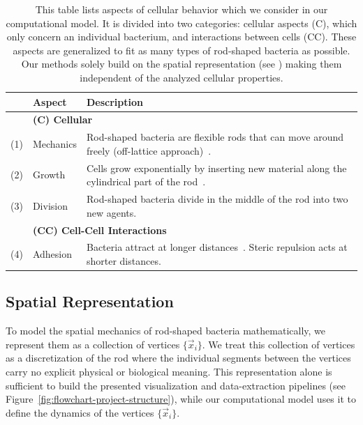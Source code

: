 \begin{table}[H]
    \centering
    \def\arraystretch{1.3}
    \begin{tabularx}{\textwidth}{c l X}
        &\textbf{Aspect} & \textbf{Description}\\
        \toprule
        &\multicolumn{2}{l}{\textbf{(C) Cellular}}\\
        \midrule
        (1) & Mechanics &
            Rod-shaped bacteria are flexible rods that can move around freely (off-lattice
            approach)~\cite{Takeuchi2005,Ursell2014,Amir2014_2}.\\
        (2) & Growth &
            Cells grow exponentially by inserting new material along the cylindrical part of the
            rod~\cite{Robert2014,Takeuchi2005}.\\
        (3) & Division &
            Rod-shaped bacteria divide in the middle of the rod into two new agents.\\
        &\multicolumn{2}{l}{\textbf{(CC) Cell-Cell Interactions}}\\
        \midrule
        (4) & Adhesion &
            Bacteria attract at longer distances~\cite{Verwey1947,Trejo2013}.
            Steric repulsion acts at shorter distances.\\
        \bottomrule
    \end{tabularx}
    \caption[Simulation Aspects of Elongated Bacteria Computational Model]{
        This table lists aspects of cellular behavior which we consider in our computational model.
        It is divided into two categories: cellular aspects (C), which only concern an individual
        bacterium, and interactions between cells (CC).
        These aspects are generalized to fit as many types of rod-shaped bacteria as possible.
        Our methods solely build on the spatial representation (see
        ) making them independent of the analyzed cellular
        properties.
    }
    \label{table:simulation-aspects}
\end{table}

\subsection{Spatial Representation}
\label{subsec:spatial-representation}
To model the spatial mechanics of rod-shaped bacteria \cite{Billaudeau2017} mathematically, we represent them as a
collection of vertices $\{\vec{x}_i\}$.
We treat this collection of vertices as a discretization of the rod where the individual segments
between the vertices carry no explicit physical or biological meaning.
This representation alone is sufficient to build the presented visualization and data-extraction
pipelines (see Figure~\ref{fig:flowchart-project-structure}), while our computational model uses it
to define the dynamics of the vertices $\{\vec{x}_i\}$.

